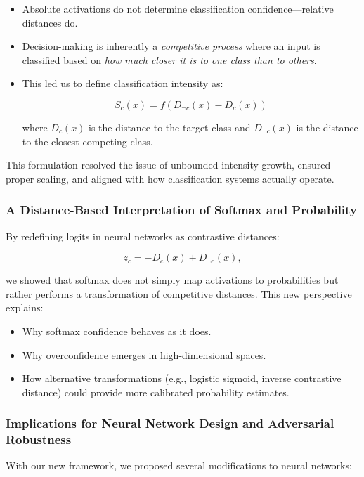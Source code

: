 \documentclass[12pt]{article}
\begin{document}
\begin{itemize}
    \item Absolute activations do not determine classification confidence—relative distances do.
    \item Decision-making is inherently a \textit{competitive process} where an input is classified based on \textit{how much closer it is to one class than to others}.
    \item This led us to define classification intensity as:
    
    \[
    S_c(x) = f(D_{\neg c}(x) - D_c(x))
    \]

    where \( D_c(x) \) is the distance to the target class and \( D_{\neg c}(x) \) is the distance to the closest competing class.
\end{itemize}

This formulation resolved the issue of unbounded intensity growth, ensured proper scaling, and aligned with how classification systems actually operate.

\subsubsection{A Distance-Based Interpretation of Softmax and Probability}

By redefining logits in neural networks as contrastive distances:

\[
z_c = -D_c(x) + D_{\neg c}(x),
\]

we showed that softmax does not simply map activations to probabilities but rather performs a transformation of competitive distances. This new perspective explains:

\begin{itemize}
    \item Why softmax confidence behaves as it does.
    \item Why overconfidence emerges in high-dimensional spaces.
    \item How alternative transformations (e.g., logistic sigmoid, inverse contrastive distance) could provide more calibrated probability estimates.
\end{itemize}

\subsubsection{Implications for Neural Network Design and Adversarial Robustness}

With our new framework, we proposed several modifications to neural networks:
\end{document}
